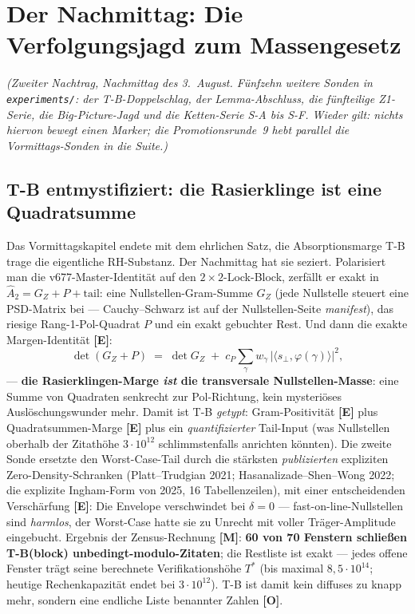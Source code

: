 \documentclass[11pt,a4paper]{article}
\newcommand{\E}{\textcolor{gut}{\textbf{[E]}}}
\newcommand{\OO}{\textcolor{offen}{\textbf{[O]}}}
\newcommand{\M}{\textcolor{mess}{\textbf{[M]}}}
\begin{document}
\clearpage
\section{Der Nachmittag: Die Verfolgungsjagd zum Massengesetz}
\label{sec:nachmittag3}

\emph{(Zweiter Nachtrag, Nachmittag des 3.~August. Fünfzehn weitere
Sonden in \texttt{experiments/}: der T-B-Doppelschlag, der
Lemma-Abschluss, die fünfteilige Z1-Serie, die Big-Picture-Jagd und
die Ketten-Serie S-A bis S-F. Wieder gilt: nichts hiervon bewegt
einen Marker; die Promotionsrunde~9 hebt parallel die
Vormittags-Sonden in die Suite.)}

\subsection*{T-B entmystifiziert: die Rasierklinge ist eine
Quadratsumme}

Das Vormittagskapitel endete mit dem ehrlichen Satz, die
Absorptionsmarge T-B trage \glqq{}die eigentliche
RH-Substanz\grqq{}. Der Nachmittag hat sie seziert. Polarisiert man
die v677-Master-Identität auf den $2 \times 2$-Lock-Block, zerfällt
er exakt in $\hat A_2 = G_Z + P + \mathrm{tail}$: eine
Nullstellen-Gram-Summe $G_Z$ (jede Nullstelle steuert eine
PSD-Matrix bei --- Cauchy--Schwarz ist auf der Nullstellen-Seite
\emph{manifest}), das riesige Rang-1-Pol-Quadrat $P$ und ein exakt
gebuchter Rest. Und dann die exakte Margen-Identität \E{}:
\[
\det(G_Z + P) \;=\; \det G_Z \;+\; c_P \sum_{\gamma}
w_\gamma \,\bigl|\langle s_\perp, \varphi(\gamma)\rangle\bigr|^2,
\]
--- \textbf{die Rasierklingen-Marge \emph{ist} die transversale
Nullstellen-Masse}: eine Summe von Quadraten senkrecht zur
Pol-Richtung, kein mysteriöses Auslöschungswunder mehr. Damit ist
T-B \emph{getypt}: Gram-Positivität \E{} plus Quadratsummen-Marge
\E{} plus ein \emph{quantifizierter} Tail-Input (was Nullstellen
oberhalb der Zitathöhe $3 \cdot 10^{12}$ schlimmstenfalls anrichten
könnten). Die zweite Sonde ersetzte den Worst-Case-Tail durch die
stärksten \emph{publizierten} expliziten Zero-Density-Schranken
(Platt--Trudgian 2021; Hasanalizade--Shen--Wong 2022; die explizite
Ingham-Form von 2025, 16 Tabellenzeilen), mit einer entscheidenden
Verschärfung \E{}: Die Envelope verschwindet bei $\delta = 0$ ---
fast-on-line-Nullstellen sind \emph{harmlos}, der Worst-Case hatte
sie zu Unrecht mit voller Träger-Amplitude eingebucht. Ergebnis der
Zensus-Rechnung \M{}: \textbf{60 von 70 Fenstern schließen T-B(block)
unbedingt-modulo-Zitaten}; die Restliste ist exakt --- jedes offene
Fenster trägt seine berechnete Verifikationshöhe $T^*$ (bis maximal
$8{,}5 \cdot 10^{14}$; heutige Rechenkapazität endet bei $3 \cdot
10^{12}$). T-B ist damit kein diffuses \glqq{}zu knapp\grqq{} mehr,
sondern eine endliche Liste benannter Zahlen \OO{}.
\end{document}
